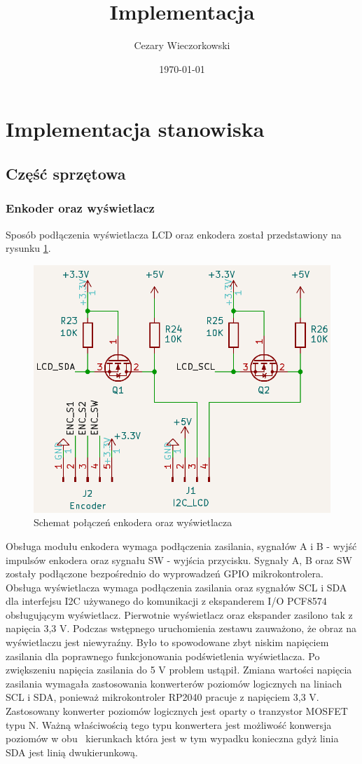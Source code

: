 \documentclass[../main.tex]{subfiles}
\author{Cezary Wieczorkowski}
\date{\today}
\title{Implementacja}
\begin{document}
\section{Implementacja stanowiska}

\subsection{Część sprzętowa}

\subsubsection{Enkoder oraz wyświetlacz}

Sposób podłączenia wyświetlacza LCD oraz enkodera został przedstawiony na rysunku \ref{fig:lcd_enc_connection}.

\begin{figure}[H]
    \centering
    \includegraphics[width=\linewidth]{lcd_schemat.png}
    \caption{Schemat połączeń enkodera oraz wyświetlacza}
    \label{fig:lcd_enc_connection}
\end{figure}

Obsługa modułu enkodera wymaga podłączenia zasilania, sygnałów A i B - wyjść impulsów enkodera oraz sygnału SW - wyjścia przycisku. 
Sygnały A, B oraz SW zostały podłączone bezpośrednio do wyprowadzeń GPIO mikrokontrolera. Obsługa wyświetlacza wymaga podłączenia 
zasilania oraz sygnałów SCL i SDA dla interfejsu I2C używanego do komunikacji z ekspanderem I/O PCF8574 obsługującym wyświetlacz. 
Pierwotnie wyświetlacz oraz ekspander zasilono tak z napięcia 3,3 V. Podczas wstępnego uruchomienia zestawu zauważono, że
obraz na wyświetlaczu jest niewyraźny. Było to spowodowane zbyt niskim napięciem zasilania dla poprawnego funkcjonowania podświetlenia
wyświetlacza. Po zwiększeniu napięcia zasilania do 5 V problem ustąpił. Zmiana wartości napięcia zasilania wymagała zastosowania
konwerterów poziomów logicznych na liniach SCL i SDA, ponieważ mikrokontroler RP2040 pracuje z napięciem 3,3 V. Zastosowany konwerter 
poziomów logicznych jest oparty o tranzystor MOSFET typu N. Ważną właściwością tego typu konwertera jest możliwość konwersja poziomów w obu \
kierunkach która jest w tym wypadku konieczna gdyż linia SDA jest linią dwukierunkową.
\end{document}
